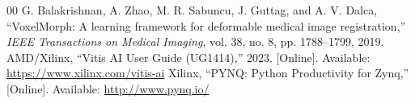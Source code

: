\documentclass[conference]{IEEEtran}
\begin{document}
\begin{thebibliography}{00}
 G. Balakrishnan, A. Zhao, M. R. Sabuncu, J. Guttag, and A. V. Dalca, ``VoxelMorph: A learning framework for deformable medical image registration,'' \emph{IEEE Transactions on Medical Imaging}, vol. 38, no. 8, pp. 1788--1799, 2019.
 AMD/Xilinx, ``Vitis AI User Guide (UG1414),'' 2023. [Online]. Available: \url{https://www.xilinx.com/vitis-ai}
 Xilinx, ``PYNQ: Python Productivity for Zynq,'' [Online]. Available: \url{http://www.pynq.io/}
\end{thebibliography}
\end{document}
